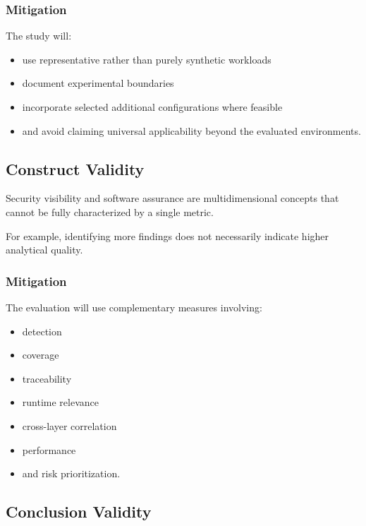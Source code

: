 \documentclass[
  12pt,
  letterpaper,
  oneside]{report}
\providecommand{\tightlist}{%
  \setlength{\itemsep}{0pt}\setlength{\parskip}{0pt}}
\begin{document}
\subsubsection{Mitigation}\label{mitigation-1}

The study will:

\begin{itemize}
\tightlist
\item
  use representative rather than purely synthetic workloads
\item
  document experimental boundaries
\item
  incorporate selected additional configurations where feasible
\item
  and avoid claiming universal applicability beyond the evaluated
  environments.
\end{itemize}

\subsection{Construct Validity}\label{1183-construct-validity}

Security visibility and software assurance are multidimensional concepts
that cannot be fully characterized by a single metric.

For example, identifying more findings does not necessarily indicate
higher analytical quality.

\subsubsection{Mitigation}\label{mitigation-2}

The evaluation will use complementary measures involving:

\begin{itemize}
\tightlist
\item
  detection
\item
  coverage
\item
  traceability
\item
  runtime relevance
\item
  cross-layer correlation
\item
  performance
\item
  and risk prioritization.
\end{itemize}

\subsection{Conclusion Validity}\label{1184-conclusion-validity}
\end{document}

